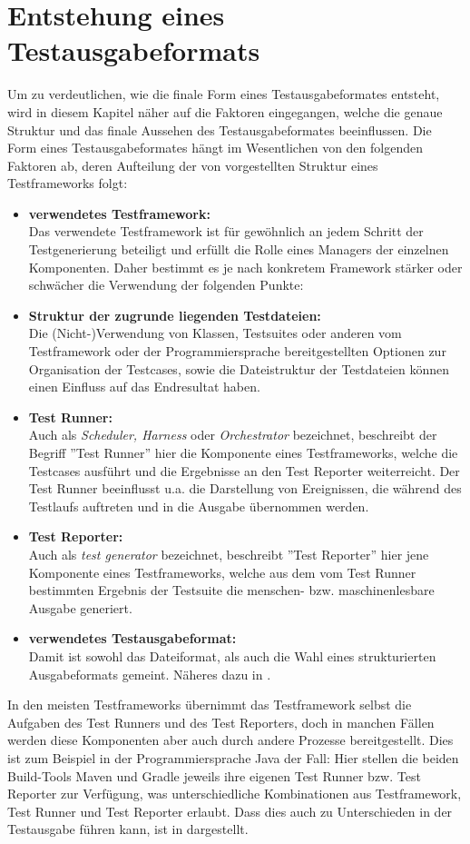 \section{Entstehung eines Testausgabeformats}
Um zu verdeutlichen, wie die finale Form eines Testausgabeformates entsteht, wird in diesem Kapitel näher auf die Faktoren eingegangen, welche die genaue Struktur und das finale Aussehen des Testausgabeformates beeinflussen.
Die Form eines Testausgabeformates hängt im Wesentlichen von den folgenden Faktoren ab, deren Aufteilung der von \textcite{winkler} vorgestellten Struktur eines Testframeworks folgt: %
\begin{itemize}
  \item \textbf{verwendetes Testframework:}\\
  Das verwendete Testframework ist für gewöhnlich an jedem Schritt der Testgenerierung beteiligt und erfüllt die Rolle eines Managers der einzelnen Komponenten. Daher bestimmt es je nach konkretem Framework stärker oder schwächer die Verwendung der folgenden Punkte:
  \newpage
  \item \textbf{Struktur der zugrunde liegenden Testdateien:}\\
  Die (Nicht-)Verwendung von Klassen, Testsuites oder anderen vom Testframework oder der Programmiersprache bereitgestellten Optionen zur Organisation der Testcases, sowie die Dateistruktur der Testdateien können einen Einfluss auf das Endresultat haben. 
  \item \textbf{Test Runner:}\\
  Auch als \textit{Scheduler, Harness} oder \textit{Orchestrator} bezeichnet, beschreibt der Begriff ''Test Runner'' hier die Komponente eines Testframeworks, welche die Testcases ausführt und die Ergebnisse an den Test Reporter weiterreicht. Der Test Runner beeinflusst u.a. die Darstellung von Ereignissen, die während des Testlaufs auftreten und in die Ausgabe übernommen werden.
  \item \textbf{Test Reporter:}\\
  Auch als \textit{test generator} bezeichnet, beschreibt ''Test Reporter'' hier jene Komponente eines Testframeworks, welche aus dem vom Test Runner bestimmten Ergebnis der Testsuite die menschen- bzw. maschinenlesbare Ausgabe generiert.
  \item \textbf{verwendetes Testausgabeformat:}\\
  Damit ist sowohl das Dateiformat, als auch die Wahl eines strukturierten Ausgabeformats gemeint. Näheres dazu in .
\end{itemize}
In den meisten Testframeworks übernimmt das Testframework selbst die Aufgaben des Test Runners und des Test Reporters, doch in manchen Fällen werden diese Komponenten aber auch durch andere Prozesse bereitgestellt. Dies ist zum Beispiel in der Programmiersprache Java der Fall: Hier stellen die beiden Build-Tools Maven und Gradle jeweils ihre eigenen Test Runner bzw. Test Reporter zur Verfügung, was unterschiedliche Kombinationen aus Testframework, Test Runner und Test Reporter erlaubt. Dass dies auch zu Unterschieden in der Testausgabe führen kann, ist in  dargestellt.


